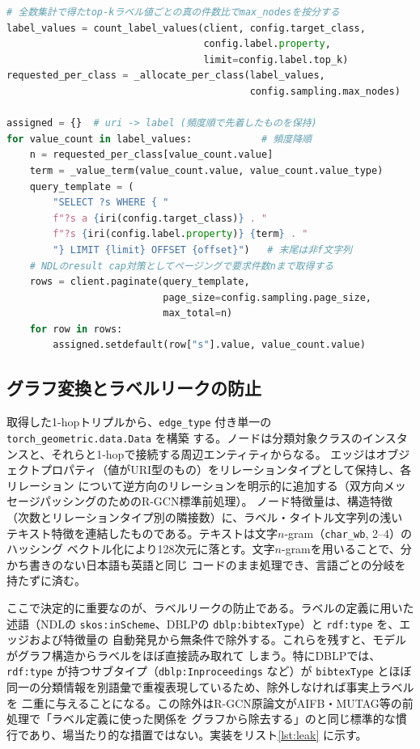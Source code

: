 \documentclass[dvipdfmx,twoside,11pt]{article}
\begin{document}
\begin{lstlisting}[language=Python, caption={ラベル値ごとの層化抽出（\texttt{rdf2graph/convert/labels.py}）。全数集計の真の比率で按分し，層ごとにページングで取得する。}, label={lst:strat}]
# 全数集計で得たtop-kラベル値ごとの真の件数比でmax_nodesを按分する
label_values = count_label_values(client, config.target_class,
                                  config.label.property,
                                  limit=config.label.top_k)
requested_per_class = _allocate_per_class(label_values,
                                          config.sampling.max_nodes)

assigned = {}  # uri -> label (頻度順で先着したものを保持)
for value_count in label_values:            # 頻度降順
    n = requested_per_class[value_count.value]
    term = _value_term(value_count.value, value_count.value_type)
    query_template = (
        "SELECT ?s WHERE { "
        f"?s a {iri(config.target_class)} . "
        f"?s {iri(config.label.property)} {term} . "
        "} LIMIT {limit} OFFSET {offset}")   # 末尾は非f文字列
    # NDLのresult cap対策としてページングで要求件数nまで取得する
    rows = client.paginate(query_template,
                           page_size=config.sampling.page_size,
                           max_total=n)
    for row in rows:
        assigned.setdefault(row["s"].value, value_count.value)
\end{lstlisting}

\subsection{グラフ変換とラベルリークの防止}

取得した1-hopトリプルから、\texttt{edge\_type} 付き単一の \texttt{torch\_geometric.data.Data} を構築
する。ノードは分類対象クラスのインスタンスと、それらと1-hopで接続する周辺エンティティからなる。
エッジはオブジェクトプロパティ（値がURI型のもの）をリレーションタイプとして保持し、各リレーション
について逆方向のリレーションを明示的に追加する（双方向メッセージパッシングのためのR-GCN標準前処理）。
ノード特徴量は、構造特徴（次数とリレーションタイプ別の隣接数）に、ラベル・タイトル文字列の浅い
テキスト特徴を連結したものである。テキストは文字$n$-gram（\texttt{char\_wb}, 2--4）のハッシング
ベクトル化により128次元に落とす。文字$n$-gramを用いることで、分かち書きのない日本語も英語と同じ
コードのまま処理でき、言語ごとの分岐を持たずに済む。

ここで決定的に重要なのが、ラベルリークの防止である。ラベルの定義に用いた述語（NDLの
\texttt{skos:inScheme}、DBLPの \texttt{dblp:bibtexType}）と \texttt{rdf:type} を、エッジおよび特徴量の
自動発見から無条件で除外する。これらを残すと、モデルがグラフ構造からラベルをほぼ直接読み取れて
しまう。特にDBLPでは、\texttt{rdf:type} が持つサブタイプ（\texttt{dblp:Inproceedings} など）が
\texttt{bibtexType} とほぼ同一の分類情報を別語彙で重複表現しているため、除外しなければ事実上ラベルを
二重に与えることになる。この除外はR-GCN原論文がAIFB・MUTAG等の前処理で「ラベル定義に使った関係を
グラフから除去する」のと同じ標準的な慣行であり、場当たり的な措置ではない。実装をリスト\ref{lst:leak}
に示す。
\end{document}
